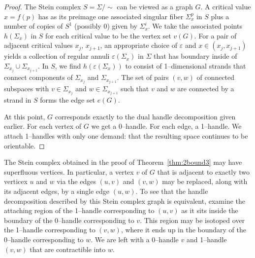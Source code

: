 \begin{proof}
	The Stein complex $S=\Sigma/\!\!\sim$ can be viewed as a graph $G$.
	A critical value $x=f(p)$ has as its preimage one associated singular fiber $\Sigma_x^p$ in $S$ plus a number of copies of $S^1$ (possibly 0) given by $\Sigma_x^i$.
	We take the associated points $h(\Sigma_x)$ in $S$ for each critical value to be the vertex set $v(G)$.
	For a pair of adjacent critical values $x_{j}$, $x_{j+1}$, an appropriate choice of $\varepsilon$ and $x\in(x_{j},x_{j+1})$ yields a collection of regular annuli $\varepsilon(\Sigma_x)$ in $\Sigma$ that has boundary inside of $\Sigma_{x_{j}}\cup\Sigma_{x_{j+1}}$.
	In $S$, we find $h(\varepsilon(\Sigma_x))$ to consist of 1--dimensional strands that connect components of $\Sigma_{x_{j}}$ and $\Sigma_{x_{j+1}}$.
	The set of pairs $(v,w)$ of connected subspaces with $v\in\Sigma_{x_{j}}$ and $w\in\Sigma_{x_{j+1}}$ such that $v$ and $w$ are connected by a strand in $S$ forms the edge set $e(G)$.
	
	At this point, $G$ corresponds exactly to the dual handle decomposition given earlier.
	For each vertex of $G$ we get a 0--handle.
	For each edge, a 1--handle.
	We attach 1--handles with only one demand: that the resulting space continues to be orientable.
\end{proof}

The Stein complex obtained in the proof of Theorem~\ref{thm:2bound3} may have superfluous vertices.
In particular, a vertex $v$ of $G$ that is adjacent to exactly two verticex $u$ and $w$ via the edges $(u,v)$ and $(v,w)$ may be replaced, along with its adjacent edges, by a single edge $(u,w)$.
To see that the handle decomposition described by this Stein complex graph is equivalent, examine the attaching region of the 1--handle corresponding to $(u,v)$ as it sits inside the boundary of the 0--handle corresponding to $v$.
This region may be isotoped over the 1--handle corresponding to $(v,w)$, where it ends up in the boundary of the 0--handle corresponding to $w$.
We are left with a 0--handle $v$ and 1--handle $(v,w)$ that are contractible into $w$.